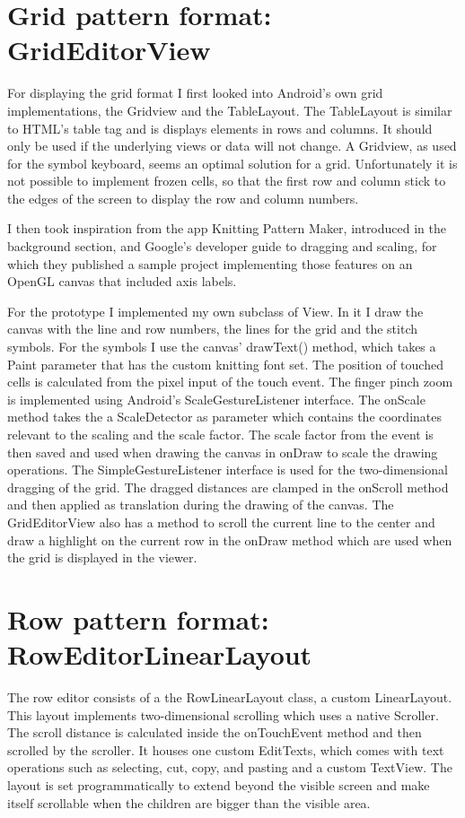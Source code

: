 \section{Grid pattern format: GridEditorView}
For displaying the grid format I first looked into Android’s own grid implementations, the Gridview and the TableLayout. The TableLayout is similar to HTML’s table tag and is displays elements in rows and columns. It should only be used if the underlying views or data will not change. A Gridview, as used for the symbol keyboard, seems an optimal solution for a grid. Unfortunately it is not possible to implement frozen cells, so that the first row and column stick to the edges of the screen to display the row and column numbers.

I then took inspiration from the app Knitting Pattern Maker, introduced in the background section, and Google’s developer guide to dragging and scaling, for which they published a sample project implementing those features on an OpenGL canvas that included axis labels.

For the prototype I implemented my own subclass of View. In it I draw the canvas with the line and row numbers, the lines for the grid and the stitch symbols. For the symbols I use the canvas’ drawText() method, which takes a Paint parameter that has the custom knitting font set. The position of touched cells is calculated from the pixel input of the touch event. The finger pinch zoom is implemented using Android’s ScaleGestureListener interface. The onScale method takes the a ScaleDetector as parameter which contains the coordinates relevant to the scaling and the scale factor. The scale factor from the event is then saved and used when drawing the canvas in onDraw to scale the drawing operations. The SimpleGestureListener interface is used for the two-dimensional dragging of the grid. The dragged distances are clamped in the onScroll method and then applied as translation during the drawing of the canvas.
The GridEditorView also has a method to scroll the current line to the center and draw a highlight on the current row in the onDraw method which are used when the grid is displayed in the viewer.

\section{Row pattern format: RowEditorLinearLayout}
The row editor consists of a the RowLinearLayout class, a custom LinearLayout. This layout implements two-dimensional scrolling which uses a native Scroller. The scroll distance is calculated inside the onTouchEvent method and then scrolled by the scroller. It houses one custom EditTexts, which comes with text operations such as selecting, cut, copy, and pasting and a custom TextView. The layout is set programmatically to extend beyond the visible screen and make itself scrollable when the children are bigger than the visible area.

